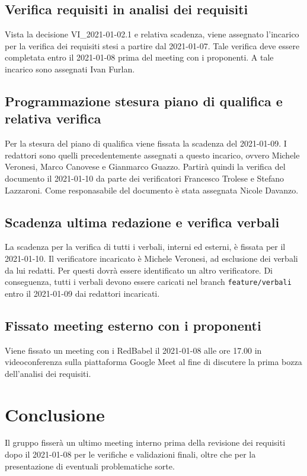 \subsection{Verifica requisiti in analisi dei requisiti}
Vista la decisione VI\_2021-01-02.1 e relativa scadenza, viene assegnato l'incarico per la verifica dei requisiti stesi
a partire dal 2021-01-07. Tale verifica deve essere completata entro il 2021-01-08 prima del meeting con i proponenti.
A tale incarico sono assegnati Ivan Furlan.

\subsection{Programmazione stesura piano di qualifica e relativa verifica}
Per la stesura del piano di qualifica viene fissata la scadenza del 2021-01-09. I redattori sono quelli precedentemente assegnati a questo
incarico, ovvero Michele Veronesi, Marco Canovese e Gianmarco Guazzo.
Partirà quindi la verifica del documento il 2021-01-10 da parte dei verificatori Francesco Trolese e Stefano Lazzaroni.
Come responasabile del documento è stata assegnata Nicole Davanzo.

\subsection{Scadenza ultima redazione e verifica verbali}
La scadenza per la verifica di tutti i verbali, interni ed esterni, è fissata per il 2021-01-10.
Il verificatore incaricato è Michele Veronesi, ad esclusione dei verbali da lui redatti. Per questi dovrà
essere identificato un altro verificatore.
Di conseguenza, tutti i verbali devono essere caricati nel branch \verb|feature/verbali| entro il 2021-01-09
dai redattori incaricati.

\subsection{Fissato meeting esterno con i proponenti}
Viene fissato un meeting con i RedBabel il 2021-01-08 alle ore 17.00 in videoconferenza sulla piattaforma Google Meet
al fine di discutere la prima bozza dell'analisi dei requisiti.

\section{Conclusione}
Il gruppo fisserà un ultimo meeting interno prima della revisione dei requisiti dopo il 2021-01-08 per
le verifiche e validazioni finali, oltre che per la presentazione di eventuali problematiche sorte.


